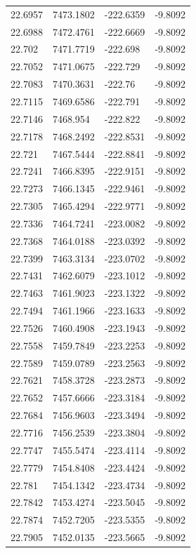 \begin{table}[H]
\begin{tabular}{llll}
22.6957 & 7473.1802 & -222.6359 & -9.8092 \\
22.6988 & 7472.4761 & -222.6669 & -9.8092 \\
22.702 & 7471.7719 & -222.698 & -9.8092 \\
22.7052 & 7471.0675 & -222.729 & -9.8092 \\
22.7083 & 7470.3631 & -222.76 & -9.8092 \\
22.7115 & 7469.6586 & -222.791 & -9.8092 \\
22.7146 & 7468.954 & -222.822 & -9.8092 \\
22.7178 & 7468.2492 & -222.8531 & -9.8092 \\
22.721 & 7467.5444 & -222.8841 & -9.8092 \\
22.7241 & 7466.8395 & -222.9151 & -9.8092 \\
22.7273 & 7466.1345 & -222.9461 & -9.8092 \\
22.7305 & 7465.4294 & -222.9771 & -9.8092 \\
22.7336 & 7464.7241 & -223.0082 & -9.8092 \\
22.7368 & 7464.0188 & -223.0392 & -9.8092 \\
22.7399 & 7463.3134 & -223.0702 & -9.8092 \\
22.7431 & 7462.6079 & -223.1012 & -9.8092 \\
22.7463 & 7461.9023 & -223.1322 & -9.8092 \\
22.7494 & 7461.1966 & -223.1633 & -9.8092 \\
22.7526 & 7460.4908 & -223.1943 & -9.8092 \\
22.7558 & 7459.7849 & -223.2253 & -9.8092 \\
22.7589 & 7459.0789 & -223.2563 & -9.8092 \\
22.7621 & 7458.3728 & -223.2873 & -9.8092 \\
22.7652 & 7457.6666 & -223.3184 & -9.8092 \\
22.7684 & 7456.9603 & -223.3494 & -9.8092 \\
22.7716 & 7456.2539 & -223.3804 & -9.8092 \\
22.7747 & 7455.5474 & -223.4114 & -9.8092 \\
22.7779 & 7454.8408 & -223.4424 & -9.8092 \\
22.781 & 7454.1342 & -223.4734 & -9.8092 \\
22.7842 & 7453.4274 & -223.5045 & -9.8092 \\
22.7874 & 7452.7205 & -223.5355 & -9.8092 \\
22.7905 & 7452.0135 & -223.5665 & -9.8092 \\

\end{tabular}
\end{table}
